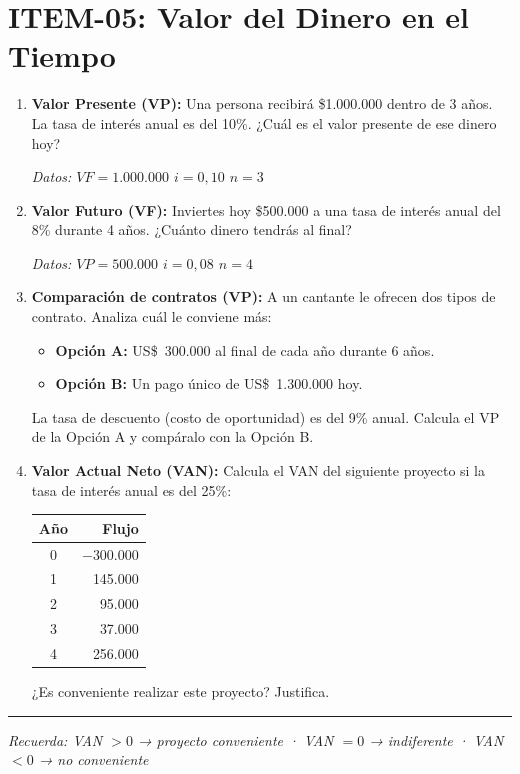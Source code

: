 \documentclass[12pt,a4paper]{article}
\newcommand{\answerspace}{\vspace{4.5cm}}
\newcommand{\lastanswerspace}{\vspace{2cm}}
\begin{document}
\section{ITEM-05: Valor del Dinero en el Tiempo}

\begin{enumerate}[label=\textbf{\arabic*.}, leftmargin=*, itemsep=0pt]

\item \textbf{Valor Presente (VP):} Una persona recibirá \$1.000.000 dentro de 3 años. La tasa de interés anual es del 10\%. ¿Cuál es el valor presente de ese dinero hoy?

\vspace{0.3em}
\noindent\textit{Datos: $VF = 1.000.000$ \quad $i = 0{,}10$ \quad $n = 3$}
\answerspace

\item \textbf{Valor Futuro (VF):} Inviertes hoy \$500.000 a una tasa de interés anual del 8\% durante 4 años. ¿Cuánto dinero tendrás al final?

\vspace{0.3em}
\noindent\textit{Datos: $VP = 500.000$ \quad $i = 0{,}08$ \quad $n = 4$}
\answerspace

\item \textbf{Comparación de contratos (VP):} A un cantante le ofrecen dos tipos de contrato. Analiza cuál le conviene más:
  \begin{itemize}
    \item \textbf{Opción A:} US\$~300.000 al final de cada año durante 6 años.
    \item \textbf{Opción B:} Un pago único de US\$~1.300.000 hoy.
  \end{itemize}
  La tasa de descuento (costo de oportunidad) es del 9\% anual. Calcula el VP de la Opción A y compáralo con la Opción B.
\answerspace

\item \textbf{Valor Actual Neto (VAN):} Calcula el VAN del siguiente proyecto si la tasa de interés anual es del 25\%:

\vspace{0.5em}
\begin{center}
\renewcommand{\arraystretch}{1.4}
\begin{tabular}{|c|r|}
\hline
\textbf{Año} & \textbf{Flujo} \\
\hline
0 & $-$300.000 \\
1 & 145.000 \\
2 & 95.000 \\
3 & 37.000 \\
4 & 256.000 \\
\hline
\end{tabular}
\end{center}
\vspace{0.4em}
¿Es conveniente realizar este proyecto? Justifica.
\lastanswerspace

\end{enumerate}

\vspace{1em}
\noindent\rule{\textwidth}{0.8pt}
\begin{center}
  \small\textit{Recuerda: VAN $> 0$ → proyecto conveniente \quad · \quad VAN $= 0$ → indiferente \quad · \quad VAN $< 0$ → no conveniente}
\end{center}
\end{document}
